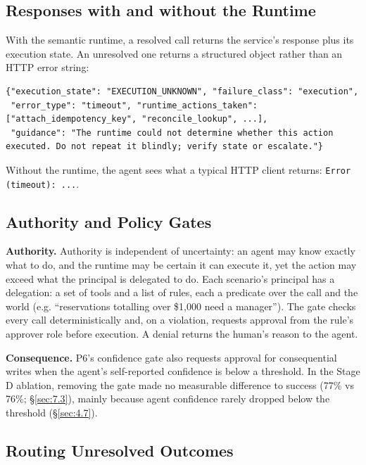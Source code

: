 \documentclass[letterpaper,twocolumn,10pt]{article}
\begin{document}
\subsection{Responses with and without the Runtime}\label{sec:4.4}

With the semantic runtime, a resolved call returns the service's response plus its execution state. An unresolved one returns a structured object rather than an HTTP error string:

\begin{Verbatim}[breaklines,samepage=true,fontsize=\footnotesize]
{"execution_state": "EXECUTION_UNKNOWN", "failure_class": "execution",
 "error_type": "timeout", "runtime_actions_taken": ["attach_idempotency_key", "reconcile_lookup", ...],
 "guidance": "The runtime could not determine whether this action executed. Do not repeat it blindly; verify state or escalate."}
\end{Verbatim}

Without the runtime, the agent sees what a typical HTTP client returns: \texttt{Error (timeout): ...}.

\subsection{Authority and Policy Gates}\label{sec:4.5}

\textbf{Authority.} Authority is independent of uncertainty: an agent may know exactly what to do, and the runtime may be certain it can execute it, yet the action may exceed what the principal is delegated to do. Each scenario's principal has a delegation: a set of tools and a list of rules, each a predicate over the call and the world (e.g. ``reservations totalling over \$1,000 need a manager''). The gate checks every call deterministically and, on a violation, requests approval from the rule's approver role before execution. A denial returns the human's reason to the agent.

\textbf{Consequence.} P6's confidence gate also requests approval for consequential writes when the agent's self-reported confidence is below a threshold. In the Stage D ablation, removing the gate made no measurable difference to success (77\% vs 76\%; \S\ref{sec:7.3}), mainly because agent confidence rarely dropped below the threshold (\S\ref{sec:4.7}).

\subsection{Routing Unresolved Outcomes}\label{sec:4.6}
\end{document}
